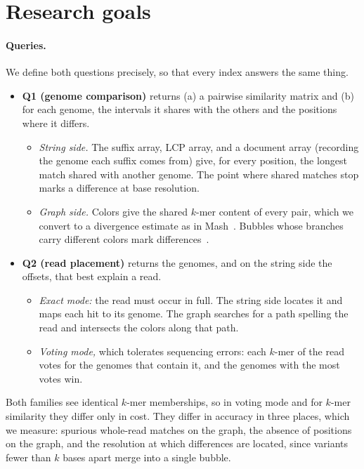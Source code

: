 \documentclass[a4paper,11pt]{article}
\theoremstyle{definition}
\begin{document}
\section{Research goals}

\paragraph{Queries.} We define both questions precisely, so that every index answers the same thing.
\begin{itemize}[leftmargin=1.5em, itemsep=2pt]
\item \textbf{Q1 (genome comparison)} returns (a) a pairwise similarity matrix and (b) for each genome, the intervals it shares with the others and the positions where it differs.
  \begin{itemize}[leftmargin=1.2em, itemsep=0pt]
  \item \emph{String side.} The suffix array, LCP array, and a document array (recording the genome each suffix comes from) give, for every position, the longest match shared with another genome. The point where shared matches stop marks a difference at base resolution.
  \item \emph{Graph side.} Colors give the shared $k$-mer content of every pair, which we convert to a divergence estimate as in Mash~\cite{ondov2016mash}. Bubbles whose branches carry different colors mark differences~\cite{iqbal2012colored}.
  \end{itemize}
\item \textbf{Q2 (read placement)} returns the genomes, and on the string side the offsets, that best explain a read.
  \begin{itemize}[leftmargin=1.2em, itemsep=0pt]
  \item \emph{Exact mode:} the read must occur in full. The string side locates it and maps each hit to its genome. The graph searches for a path spelling the read and intersects the colors along that path.
  \item \emph{Voting mode,} which tolerates sequencing errors: each $k$-mer of the read votes for the genomes that contain it, and the genomes with the most votes win.
  \end{itemize}
\end{itemize}
Both families see identical $k$-mer memberships, so in voting mode and for $k$-mer similarity they differ only in cost. They differ in accuracy in three places, which we measure: spurious whole-read matches on the graph, the absence of positions on the graph, and the resolution at which differences are located, since variants fewer than $k$ bases apart merge into a single bubble.
\end{document}
